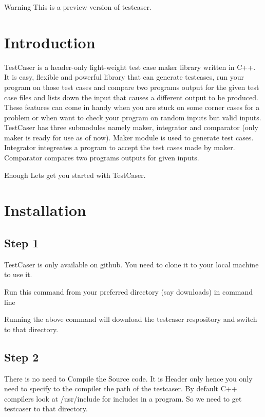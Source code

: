 \begin{DoxyWarning}{Warning}
This is a preview version of testcaser.
\end{DoxyWarning}
\hypertarget{index_sec_intro}{}\section{Introduction}\label{index_sec_intro}
Test\+Caser is a header-\/only light-\/weight test case maker library written in C++. It is easy, flexible and powerful library that can generate testcases, run your program on those test cases and compare two program\textquotesingle{}s output for the given test case files and lists down the input that causes a different output to be produced. These features can come in handy when you are stuck on some corner cases for a problem or when want to check your program on random inputs but valid inputs. Test\+Caser has three submodules namely maker, integrator and comparator (only maker is ready for use as of now). Maker module is used to generate test cases. Integrator integreates a program to accept the test cases made by maker. Comparator compares two program\textquotesingle{}s outputs for given inputs.

Enough Let\textquotesingle{}s get you started with Test\+Caser.\hypertarget{index_sec_install}{}\section{Installation}\label{index_sec_install}
\hypertarget{index_step1}{}\subsection{Step 1}\label{index_step1}
Test\+Caser is only available on github. You need to clone it to your local machine to use it.

Run this command from your preferred directory (say downloads) in command line 
\begin{DoxyCode}{0}
\end{DoxyCode}
 Running the above command will download the testcaser respository and switch to that directory.\hypertarget{index_step2}{}\subsection{Step 2}\label{index_step2}
There is no need to Compile the Source code. It is Header only hence you only need to specify to the compiler the path of the testcaser. By default C++ compilers look at /usr/include for includes in a program. So we need to get testcaser to that directory.

